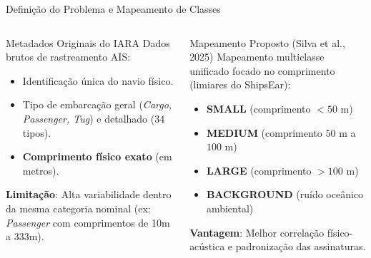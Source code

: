 \documentclass{beamer}
\begin{document}
\begin{frame}{Definição do Problema e Mapeamento de Classes}
    \small
    \begin{columns}[t]
        \begin{block}{Metadados Originais do IARA}
            \footnotesize
            Dados brutos de rastreamento AIS:
            \begin{itemize}
                \item Identificação única do navio físico.
                \item Tipo de embarcação geral (\textit{Cargo, Passenger, Tug}) e detalhado (34 tipos).
                \item \textbf{Comprimento físico exato} (em metros).
            \end{itemize}
            \vspace{0.1cm}
            \textbf{Limitação}: Alta variabilidade dentro da mesma categoria nominal (ex: \textit{Passenger} com comprimentos de 10m a 333m).
        \end{block}
        
        \begin{block}{Mapeamento Proposto (Silva et al., 2025)}
            \footnotesize
            Mapeamento multiclasse unificado focado no comprimento (limiares do ShipsEar):
            \begin{itemize}
                \item \textbf{SMALL} (comprimento $< 50$ m)
                \item \textbf{MEDIUM} (comprimento $50$ m a $100$ m)
                \item \textbf{LARGE} (comprimento $> 100$ m)
                \item \textbf{BACKGROUND} (ruído oceânico ambiental)
            \end{itemize}
            \vspace{0.1cm}
            \textbf{Vantagem}: Melhor correlação físico-acústica e padronização das assinaturas.
        \end{block}
    \end{columns}
\end{frame}


\end{document}
